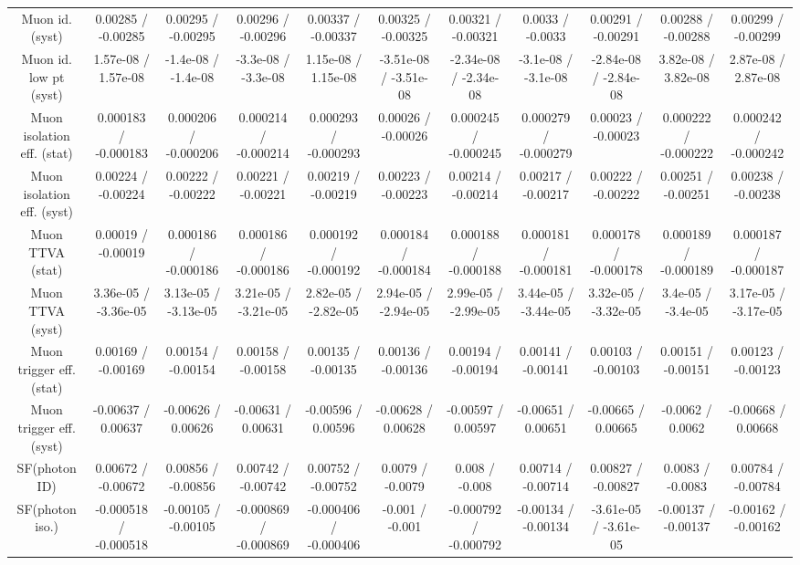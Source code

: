 \begin{table}[htbp]
\begin{center}
\begin{tabular}{|c|c|c|c|c|c|c|c|c|c|c|}
  Muon id. (syst) & 0.00285 / -0.00285 & 0.00295 / -0.00295 & 0.00296 / -0.00296 & 0.00337 / -0.00337 & 0.00325 / -0.00325 & 0.00321 / -0.00321 & 0.0033 / -0.0033 & 0.00291 / -0.00291 & 0.00288 / -0.00288 & 0.00299 / -0.00299 \\ 
  Muon id. low pt (syst) & 1.57e-08 / 1.57e-08 & -1.4e-08 / -1.4e-08 & -3.3e-08 / -3.3e-08 & 1.15e-08 / 1.15e-08 & -3.51e-08 / -3.51e-08 & -2.34e-08 / -2.34e-08 & -3.1e-08 / -3.1e-08 & -2.84e-08 / -2.84e-08 & 3.82e-08 / 3.82e-08 & 2.87e-08 / 2.87e-08 \\ 
  Muon isolation eff. (stat) & 0.000183 / -0.000183 & 0.000206 / -0.000206 & 0.000214 / -0.000214 & 0.000293 / -0.000293 & 0.00026 / -0.00026 & 0.000245 / -0.000245 & 0.000279 / -0.000279 & 0.00023 / -0.00023 & 0.000222 / -0.000222 & 0.000242 / -0.000242 \\ 
  Muon isolation eff. (syst) & 0.00224 / -0.00224 & 0.00222 / -0.00222 & 0.00221 / -0.00221 & 0.00219 / -0.00219 & 0.00223 / -0.00223 & 0.00214 / -0.00214 & 0.00217 / -0.00217 & 0.00222 / -0.00222 & 0.00251 / -0.00251 & 0.00238 / -0.00238 \\ 
  Muon TTVA (stat) & 0.00019 / -0.00019 & 0.000186 / -0.000186 & 0.000186 / -0.000186 & 0.000192 / -0.000192 & 0.000184 / -0.000184 & 0.000188 / -0.000188 & 0.000181 / -0.000181 & 0.000178 / -0.000178 & 0.000189 / -0.000189 & 0.000187 / -0.000187 \\ 
  Muon TTVA (syst) & 3.36e-05 / -3.36e-05 & 3.13e-05 / -3.13e-05 & 3.21e-05 / -3.21e-05 & 2.82e-05 / -2.82e-05 & 2.94e-05 / -2.94e-05 & 2.99e-05 / -2.99e-05 & 3.44e-05 / -3.44e-05 & 3.32e-05 / -3.32e-05 & 3.4e-05 / -3.4e-05 & 3.17e-05 / -3.17e-05 \\ 
  Muon trigger eff. (stat) & 0.00169 / -0.00169 & 0.00154 / -0.00154 & 0.00158 / -0.00158 & 0.00135 / -0.00135 & 0.00136 / -0.00136 & 0.00194 / -0.00194 & 0.00141 / -0.00141 & 0.00103 / -0.00103 & 0.00151 / -0.00151 & 0.00123 / -0.00123 \\ 
  Muon trigger eff. (syst) & -0.00637 / 0.00637 & -0.00626 / 0.00626 & -0.00631 / 0.00631 & -0.00596 / 0.00596 & -0.00628 / 0.00628 & -0.00597 / 0.00597 & -0.00651 / 0.00651 & -0.00665 / 0.00665 & -0.0062 / 0.0062 & -0.00668 / 0.00668 \\ 
  SF(photon ID) & 0.00672 / -0.00672 & 0.00856 / -0.00856 & 0.00742 / -0.00742 & 0.00752 / -0.00752 & 0.0079 / -0.0079 & 0.008 / -0.008 & 0.00714 / -0.00714 & 0.00827 / -0.00827 & 0.0083 / -0.0083 & 0.00784 / -0.00784 \\ 
  SF(photon iso.) & -0.000518 / -0.000518 & -0.00105 / -0.00105 & -0.000869 / -0.000869 & -0.000406 / -0.000406 & -0.001 / -0.001 & -0.000792 / -0.000792 & -0.00134 / -0.00134 & -3.61e-05 / -3.61e-05 & -0.00137 / -0.00137 & -0.00162 / -0.00162 \\ 

\end{tabular}
\end{center}
\end{table}
